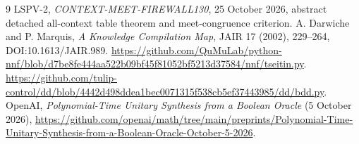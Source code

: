 \documentclass[11pt]{article}
\begin{document}
\begin{thebibliography}{9}
 LSPV-2, \emph{CONTEXT-MEET-FIREWALL130}, 25 October 2026, abstract detached all-context table theorem and meet-congruence criterion.
 A. Darwiche and P. Marquis, \emph{A Knowledge Compilation Map}, JAIR 17 (2002), 229--264, DOI:10.1613/JAIR.989.
 \url{https://github.com/QuMuLab/python-nnf/blob/d7be8fe444aa522b09bf45f81052bf5213d37584/nnf/tseitin.py}.
 \url{https://github.com/tulip-control/dd/blob/4442d498ddea1bec0071315f538cb5ef37443985/dd/bdd.py}.
 OpenAI, \emph{Polynomial-Time Unitary Synthesis from a Boolean Oracle} (5 October 2026), \url{https://github.com/openai/math/tree/main/preprints/Polynomial-Time-Unitary-Synthesis-from-a-Boolean-Oracle-October-5-2026}.
\end{thebibliography}
\end{document}
